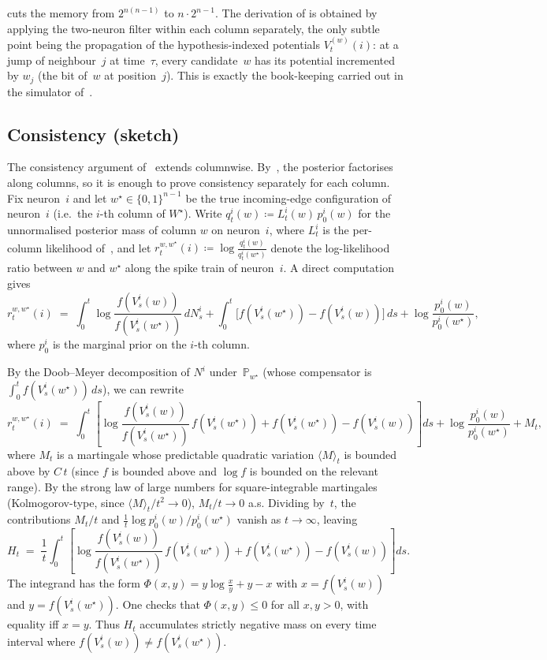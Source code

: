\documentclass[11pt,a4paper]{article}
\theoremstyle{definition}
\newcommand{\Prob}{\mathbb{P}}
\begin{document}
 cuts the memory from $2^{n(n-1)}$ to
$n \cdot 2^{n-1}$. The derivation of  is obtained
by applying the two-neuron filter within each column separately, the
only subtle point being the propagation of the hypothesis-indexed
potentials $V_t^{(w)}(i)$: at a jump of neighbour~$j$ at time~$\tau$,
every candidate~$w$ has its potential incremented by $w_j$ (the bit
of~$w$ at position~$j$). This is exactly the book-keeping carried out
in the simulator of~.

\subsection{Consistency (sketch)}

The consistency argument of~ extends
columnwise. By~, the posterior factorises
along columns, so it is enough to prove consistency separately for
each column. Fix neuron~$i$ and let $w^\star \in \{0, 1\}^{n-1}$ be
the true incoming-edge configuration of neuron~$i$ (i.e.\ the $i$-th
column of $W^\star$). Write $q_t^i(w) \coloneqq L_t^i(w)\,p_0^i(w)$ for the unnormalised posterior mass of column $w$ on neuron~$i$, where $L_t^i$ is the per-column likelihood of~, and let $r_t^{w, w^\star}(i) \coloneqq \log \frac{q_t^i(w)}{q_t^i(w^\star)}$ denote the log-likelihood ratio between $w$ and $w^\star$ along the spike train of neuron~$i$. A direct computation gives
\begin{equation}
    r_t^{w, w^\star}(i) \;=\; \int_0^t \log \frac{f(V_s^i(w))}{f(V_s^i(w^\star))}\, dN_s^i + \int_0^t \bigl[ f(V_s^i(w^\star)) - f(V_s^i(w)) \bigr]\, ds + \log \frac{p_0^i(w)}{p_0^i(w^\star)},
\end{equation}
where $p_0^i$ is the marginal prior on the $i$-th column.

By the Doob--Meyer decomposition of $N^i$ under~$\Prob_{w^\star}$
(whose compensator is $\int_0^t f(V_s^i(w^\star))\,ds$), we can rewrite
\[
r_t^{w, w^\star}(i) \;=\; \int_0^t \left[ \log \frac{f(V_s^i(w))}{f(V_s^i(w^\star))}\, f(V_s^i(w^\star)) +  f(V_s^i(w^\star)) - f(V_s^i(w)) \right] ds + \log \frac{p_0^i(w)}{p_0^i(w^\star)} + M_t,
\]
where $M_t$ is a martingale whose predictable quadratic variation $\langle M\rangle_t$ is bounded above by $C\, t$ (since $f$ is bounded above and $\log f$ is bounded on the relevant range). By the strong law of large numbers for square-integrable martingales (Kolmogorov-type, since $\langle M\rangle_t/t^2 \to 0$), $M_t/t \to 0$ a.s. Dividing by~$t$, the contributions
$M_t/t$ and $\tfrac{1}{t}\log p_0^i(w)/p_0^i(w^\star)$ vanish as
$t \to \infty$, leaving
\[
H_t \;=\; \frac{1}{t} \int_0^t \left[ \log \frac{f(V_s^i(w))}{f(V_s^i(w^\star))}\, f(V_s^i(w^\star)) +  f(V_s^i(w^\star)) - f(V_s^i(w)) \right] ds.
\]
The integrand has the form $\Phi(x, y) = y \log \tfrac{x}{y} + y - x$
with $x = f(V_s^i(w))$ and $y = f(V_s^i(w^\star))$. One checks that
$\Phi(x,y) \leq 0$ for all $x, y > 0$, with equality iff $x = y$. Thus
$H_t$ accumulates strictly negative mass on every time interval where
$f(V_s^i(w)) \neq f(V_s^i(w^\star))$.
\end{document}
